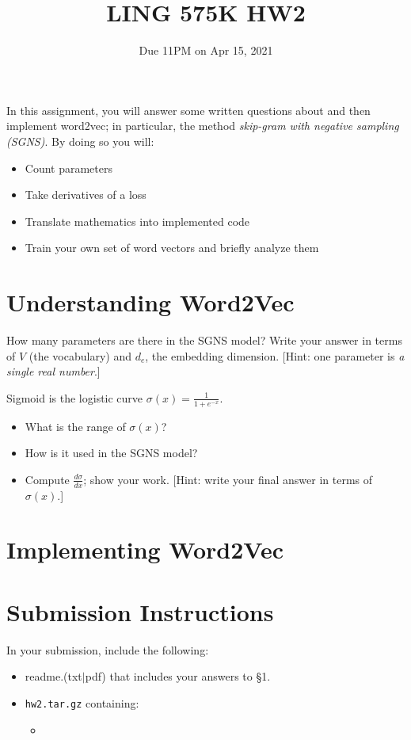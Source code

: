 \documentclass[11pt]{article}
\begin{document}
\title{LING 575K HW2}
\date{\vspace{-0.2in}Due 11PM on Apr 15, 2021}
\maketitle


In this assignment, you will answer some written questions about and then implement word2vec; in particular, the method \emph{skip-gram with negative sampling (SGNS)}.  By doing so you will:
\begin{itemize}
  \item Count parameters
  \item Take derivatives of a loss
  \item Translate mathematics into implemented code
  \item Train your own set of word vectors and briefly analyze them
\end{itemize}

\section{Understanding Word2Vec}

  How many parameters are there in the SGNS model?  Write your answer in terms of $V$ (the vocabulary) and $d_e$, the embedding dimension.  [Hint: one parameter is \emph{a single real number}.]


\vspace{2em}
  Sigmoid is the logistic curve $\sigma(x) = \frac{1}{1+e^{-x}}$.
\begin{itemize}
  \item What is the range of $\sigma(x)$?
  \item How is it used in the SGNS model?
  \item Compute $\frac{d\sigma}{dx}$; show your work.  [Hint: write your final answer in terms of $\sigma(x)$.]
\end{itemize}

\vspace{2em}


\section{Implementing Word2Vec}

\vspace{2em}

\section*{Submission Instructions}

In your submission, include the following:
\begin{itemize}
  \item readme.(txt$\mid$pdf) that includes your answers to \S1. 
  \item \texttt{hw2.tar.gz} containing:
  \begin{itemize}
    \item 
  \end{itemize}
\end{itemize}
\end{document}
